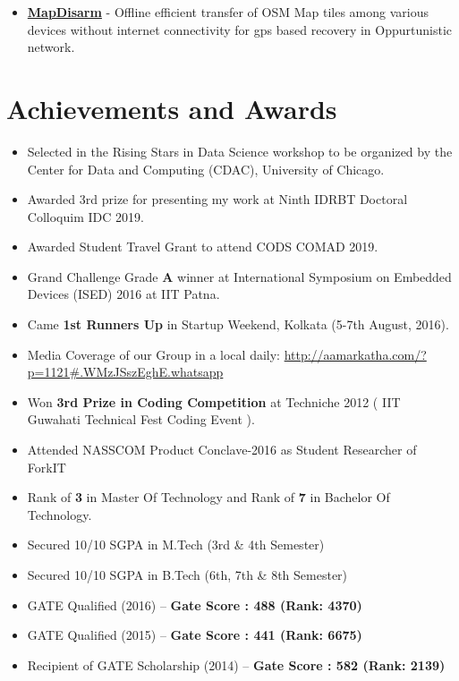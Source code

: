 \documentclass[margin, centered]{res}
\begin{document}
\begin{resume}
\begin{itemize}[leftmargin=*]
 \item \textbf{\href{https://github.com/hridaydutta123/MapDisarm}{MapDisarm}} - Offline efficient transfer of OSM Map tiles among various devices without internet connectivity for gps based recovery in Oppurtunistic network.
\end{itemize}

\section{Achievements and Awards}
\begin{itemize}[leftmargin=*]
 \item Selected in the Rising Stars in Data Science workshop to be organized by the Center for Data and Computing (CDAC), University of Chicago.
 \item Awarded 3rd prize for presenting my work at Ninth IDRBT Doctoral Colloquim IDC 2019.
 \item Awarded Student Travel Grant to attend CODS COMAD 2019.
 \item Grand Challenge Grade \textbf{A} winner at International Symposium on Embedded Devices (ISED) 2016 at IIT Patna.
 \item Came \textbf{1st Runners Up} in Startup Weekend, Kolkata (5-7th August, 2016).
 \item Media Coverage of our Group in a local daily: \url{http://aamarkatha.com/?p=1121#.WMzJSszEghE.whatsapp}
 \item Won \textbf{3rd Prize in Coding Competition} at Techniche 2012 ( IIT Guwahati Technical Fest Coding Event ).
 \item Attended NASSCOM Product Conclave-2016 as Student Researcher of ForkIT
 \item Rank of \textbf{3} in Master Of Technology and Rank of \textbf{7} in Bachelor Of Technology.
 \item Secured 10/10 SGPA in M.Tech (3rd \& 4th Semester)
 \item Secured 10/10 SGPA in B.Tech (6th, 7th \& 8th Semester)
 \item GATE Qualified (2016) – \textbf{Gate Score : 488 (Rank: 4370) }
 \item GATE Qualified (2015) – \textbf{Gate Score : 441 (Rank: 6675) }
 \item Recipient of GATE Scholarship (2014) – \textbf{Gate Score : 582 (Rank: 2139) }


\end{itemize}
\end{resume}
\end{document}
